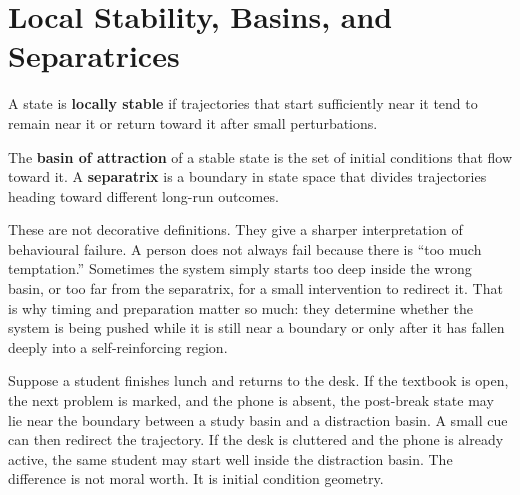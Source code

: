 \section{Local Stability, Basins, and Separatrices}

\begin{definition}
A state is \textbf{locally stable} if trajectories that start sufficiently
near it tend to remain near it or return toward it after small perturbations.
\end{definition}

\begin{definition}
The \textbf{basin of attraction} of a stable state is the set of initial
conditions that flow toward it. A \textbf{separatrix} is a boundary in state
space that divides trajectories heading toward different long-run outcomes.
\end{definition}

\begin{discussion}
These are not decorative definitions. They give a sharper interpretation of
behavioural failure. A person does not always fail because there is ``too much
temptation.'' Sometimes the system simply starts too deep inside the wrong
basin, or too far from the separatrix, for a small intervention to redirect it.
That is why timing and preparation matter so much: they determine whether the
system is being pushed while it is still near a boundary or only after it has
fallen deeply into a self-reinforcing region.
\end{discussion}

\begin{example}
Suppose a student finishes lunch and returns to the desk. If the textbook is
open, the next problem is marked, and the phone is absent, the post-break state
may lie near the boundary between a study basin and a distraction basin. A
small cue can then redirect the trajectory. If the desk is cluttered and the
phone is already active, the same student may start well inside the distraction
basin. The difference is not moral worth. It is initial condition geometry.
\end{example}
